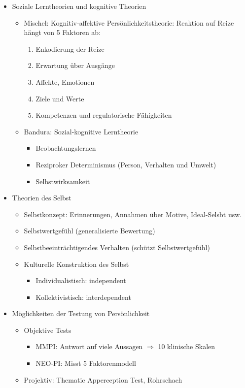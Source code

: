 \documentclass[11pt, paper=a4, twocolumn]{scrartcl}
\begin{document}
\begin{itemize}
		\item Soziale Lerntheorien und kognitive Theorien
			\begin{itemize}
				\item Mischel: Kognitiv-affektive Persönlichkeitstheorie: 
					Reaktion auf Reize hängt von 5 Faktoren ab:
					\begin{enumerate}
						\item Enkodierung der Reize
						\item Erwartung über Ausgänge
						\item Affekte, Emotionen
						\item Ziele und Werte
						\item Kompetenzen und regulatorische 
							Fähigkeiten
					\end{enumerate}
				\item Bandura: Sozial-kognitive Lerntheorie
					\begin{itemize}
						\item Beobachtungslernen
						\item Reziproker Determinismus (Person, 
							Verhalten und Umwelt)
						\item Selbstwirksamkeit
					\end{itemize}

			\end{itemize}

		\item Theorien des Selbst
			\begin{itemize}
				\item Selbstkonzept: Erinnerungen, Annahmen über Motive, 
					Ideal-Selsbt usw.
				\item Selbstwertgefühl (generalisierte Bewertung)
				\item Selbstbeeinträchtigendes Verhalten (schützt 
					Selbstwertgefühl)
				\item Kulturelle Konstruktion des Selbst
					\begin{itemize}
						\item Individualistisch: independent
						\item Kollektivistisch: interdependent
					\end{itemize}
			\end{itemize}

		\item Möglichkeiten der Testung von Persönlichkeit
			\begin{itemize}
				\item Objektive Tests
					\begin{itemize}
						\item MMPI: Antwort auf viele Aussagen 
							$\Rightarrow$ 10 klinische Skalen
						\item NEO-PI: Misst 5 Faktorenmodell

					\end{itemize}
				\item Projektiv: Thematic Apperception Test, Rohrschach
			\end{itemize}



	\end{itemize}
\end{document}
